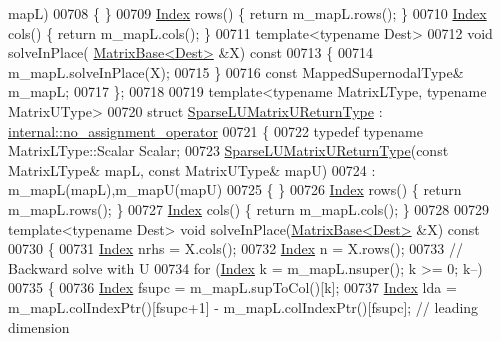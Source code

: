 \begin{DoxyCode}
      mapL)
00708   \{ \}
00709   \hyperlink{namespace_eigen_a62e77e0933482dafde8fe197d9a2cfde}{Index} rows() \{ \textcolor{keywordflow}{return} m\_mapL.rows(); \}
00710   \hyperlink{namespace_eigen_a62e77e0933482dafde8fe197d9a2cfde}{Index} cols() \{ \textcolor{keywordflow}{return} m\_mapL.cols(); \}
00711   \textcolor{keyword}{template}<\textcolor{keyword}{typename} Dest>
00712   \textcolor{keywordtype}{void} solveInPlace( \hyperlink{group___core___module_class_eigen_1_1_matrix_base}{MatrixBase<Dest>} &X)\textcolor{keyword}{ const}
00713 \textcolor{keyword}{  }\{
00714     m\_mapL.solveInPlace(X);
00715   \}
00716   \textcolor{keyword}{const} MappedSupernodalType& m\_mapL;
00717 \};
00718 
00719 \textcolor{keyword}{template}<\textcolor{keyword}{typename} MatrixLType, \textcolor{keyword}{typename} MatrixUType>
00720 \textcolor{keyword}{struct }\hyperlink{struct_eigen_1_1_sparse_l_u_matrix_u_return_type}{SparseLUMatrixUReturnType} : 
      \hyperlink{class_eigen_1_1internal_1_1no__assignment__operator}{internal::no\_assignment\_operator}
00721 \{
00722   \textcolor{keyword}{typedef} \textcolor{keyword}{typename} MatrixLType::Scalar Scalar;
00723   \hyperlink{struct_eigen_1_1_sparse_l_u_matrix_u_return_type}{SparseLUMatrixUReturnType}(\textcolor{keyword}{const} MatrixLType& mapL, \textcolor{keyword}{const} MatrixUType& mapU)
00724   : m\_mapL(mapL),m\_mapU(mapU)
00725   \{ \}
00726   \hyperlink{namespace_eigen_a62e77e0933482dafde8fe197d9a2cfde}{Index} rows() \{ \textcolor{keywordflow}{return} m\_mapL.rows(); \}
00727   \hyperlink{namespace_eigen_a62e77e0933482dafde8fe197d9a2cfde}{Index} cols() \{ \textcolor{keywordflow}{return} m\_mapL.cols(); \}
00728 
00729   \textcolor{keyword}{template}<\textcolor{keyword}{typename} Dest>   \textcolor{keywordtype}{void} solveInPlace(\hyperlink{group___core___module_class_eigen_1_1_matrix_base}{MatrixBase<Dest>} &X)\textcolor{keyword}{ const}
00730 \textcolor{keyword}{  }\{
00731     \hyperlink{namespace_eigen_a62e77e0933482dafde8fe197d9a2cfde}{Index} nrhs = X.cols();
00732     \hyperlink{namespace_eigen_a62e77e0933482dafde8fe197d9a2cfde}{Index} n    = X.rows();
00733     \textcolor{comment}{// Backward solve with U}
00734     \textcolor{keywordflow}{for} (\hyperlink{namespace_eigen_a62e77e0933482dafde8fe197d9a2cfde}{Index} k = m\_mapL.nsuper(); k >= 0; k--)
00735     \{
00736       \hyperlink{namespace_eigen_a62e77e0933482dafde8fe197d9a2cfde}{Index} fsupc = m\_mapL.supToCol()[k];
00737       \hyperlink{namespace_eigen_a62e77e0933482dafde8fe197d9a2cfde}{Index} lda = m\_mapL.colIndexPtr()[fsupc+1] - m\_mapL.colIndexPtr()[fsupc]; \textcolor{comment}{// leading dimension}

\end{DoxyCode}
